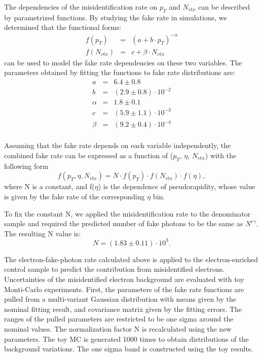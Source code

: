 \documentclass[thesis.tex]{subfiles}
\renewcommand\_{\textunderscore\allowbreak}
\begin{document}
The dependencies of the misidentification rate on $p_T$ and $N_{vtx}$ can be described by parametrized functions. By studying the fake rate in simulations, we determined that the functional forms: 
\begin{eqnarray*}
	f(p_{T})   &=& ( a + b\cdot p_T)^{-\alpha} \\
	f(N_{vtx}) &=& c + \beta \cdot N_{vtx}
\end{eqnarray*}
can be used to model the fake rate dependencies on these two variables. The parameters obtained by fitting the functions to fake rate distributions are: 
\begin{eqnarray*}
	a   &=& 6.4 \pm 0.8  \\
	b   &=& (2.9 \pm 0.8) \cdot 10^{-2} \\
	\alpha &=& 1.8 \pm 0.1 \\
	c &=& (5.9 \pm 1.1) \cdot 10^{-3} \\
	\beta &=& (9.2 \pm 0.4) \cdot 10^{-4} \\
\end{eqnarray*}

 Assuming that the fake rate depends on each variable independently, the combined fake rate can be expressed as a function of ($p_T$, $\eta$, $N_{vtx}$) with the following form 
\begin{equation} 
	f(p_{T}, \eta, N_{vtx}) = N \cdot f(p_T) \cdot f(N_{vtx}) \cdot f(\eta),
\end{equation}
where N is a constant, and f($\eta$) is the dependence of pseudorapidity, whose value is given by the fake rate of the corresponding $\eta$ bin. 

To fix the constant N, we applied the misidentification rate to the denominator sample and required the predicted number of fake photons to be the same as $N^{e\gamma}$. The resulting N value is: 
\begin{equation} 
	N = (1.83 \pm 0.11) \cdot 10^{3}.
\end{equation}


The electron-fake-photon rate calculated above is applied to the electron-enriched control sample to predict the contribution from misidentified electrons. Uncertainties of the misidentified electron background are evaluated with toy Monti-Carlo experiments. First, the parameters of the fake rate functions are pulled from a multi-variant Gaussian distribution with means given by the nominal fitting result, and covariance matrix given by the fitting errors. The ranges of the pulled parameters are restricted to be one sigma around the nominal values. The normalization factor N is recalculated using the new parameters. The toy MC is generated 1000 times to obtain distributions of the background variations. The one sigma band is constructed using the toy results.
\end{document}
